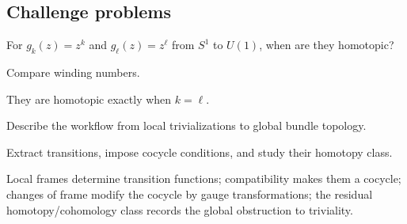 \subsection*{Challenge problems}

\begin{exercise}\label{exr:viii30-ped-15}
For $g_k(z)=z^k$ and $g_\ell(z)=z^\ell$ from $S^1$ to $U(1)$, when are they homotopic?
\end{exercise}
\begin{hint}
Compare winding numbers.
\end{hint}
\begin{solution}
They are homotopic exactly when $k=\ell$.
\end{solution}

\begin{exercise}\label{exr:viii30-ped-16}
Describe the workflow from local trivializations to global bundle topology.
\end{exercise}
\begin{hint}
Extract transitions, impose cocycle conditions, and study their homotopy class.
\end{hint}
\begin{solution}
Local frames determine transition functions; compatibility makes them a cocycle; changes of frame modify the cocycle by gauge transformations; the residual homotopy/cohomology class records the global obstruction to triviality.
\end{solution}

